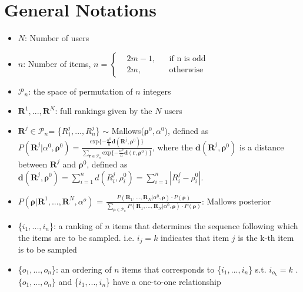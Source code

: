 \documentclass[11pt, oneside]{article}   	%
\title{}
\author{}
\date{}							%
\begin{document}
\maketitle 
\section{General Notations}

\begin{itemize}

	\item {$N$: Number of users}
	
	\item {$n$: Number of items,    $
	n = \left \{
	\begin{aligned}
	&2m-1, && \text{if n is odd} \\
	&2m, && \text{otherwise}
	\end{aligned} \right.
	$}
	
	\item{$\mathcal{P}_n$: the space of permutation of $n$ integers}
	\item {$\bm{R}^1,...,\bm{R}^N$: full rankings given by the $N$ users}
	
	
	\item {$\bm{R}^j \in \mathcal{P}_n$= \{$R^j_1,...,R^j_n$\} $\sim$ Mallows($\bm{\rho}^0, \alpha^0$), defined as 
	$P(\bm{R}^j|\alpha^0, \bm{\rho}^0) = \frac{\text{exp}\{-\frac{\alpha^0}{n}\bm{d}(\bm{R}^j, \bm{\rho}^0)\}}{\sum\limits_{\bm{r}\in \mathcal{P}_n}\text{exp}\{-\frac{\alpha^0}{n}\bm{d}(\bm{r}, \bm{\rho}^0)\}}$, where the $\bm{d}(\bm{R}^j, \bm{\rho}^0)$ is a distance between $\bm{R}^j$ and $\bm{\rho}^0$, defined as $\bm{d}(\bm{R}^j, \bm{\rho}^0) = \sum\limits_{i = 1}^{n}d(R^j_i, \rho^0_i) = \sum\limits_{i = 1}^{n}|R^j_i - \rho^0_i |$. }
	
	
	\item {$P(\bm{\rho}|\bm{R}^1,...,\bm{R}^N,\alpha^o)$ = $\frac{P(\bm{R}_1, ...,\bm{R}_N|\alpha^0, \bm{\rho})\cdot P(\bm{\rho})}{\sum\limits_{\bm{\rho}\in\mathcal{P}_n}P(\bm{R}_1, ...,\bm{R}_N|\alpha^0, \bm{\rho})\cdot P(\bm{\rho})}$: Mallows posterior}
	
	
	\item{\{$i_1, ..., i_n$\}: a ranking of $n$ items that determines the sequence following which the items are to be sampled. i.e. $i_j = k$ indicates that item $j$ is the k-th item is to be sampled}
	
	\item{ \{$o_1, ..., o_n$\}: an ordering of $n$ items that corresponds to \{$i_1, ..., i_n$\} s.t. $i_{o_k} = k$ }. $\{o_1, ...,o_n\}$ and \{$i_1, ..., i_n$\} have a one-to-one relationship
	

\end{itemize}
\end{document}
